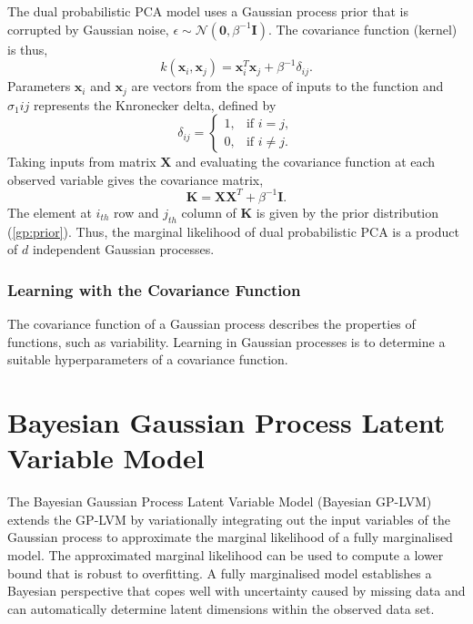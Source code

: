 \documentclass[ %
author={Dillon Keith Diep},
supervisor={Dr. Carl Henrik Ek},
degree={MEng},
title={ART-CG:},
subtitle={Assisted Real-time Content Generation of 3D Hair by Learning Manifolds},
type={Research},
year={2017} ]{dissertation}
\begin{document}
The dual probabilistic PCA model uses a Gaussian process prior that is corrupted by Gaussian noise, \cite{gplvm} $\epsilon\sim\mathcal{N}(\bm{0},\beta^{-1}\bm{I})$.
The covariance function (kernel) is thus,
\begin{equation} \label{gp:prior}
k(\bm{x}_i,\bm{x}_j)=\bm{x}^T_i\bm{x}_j+\beta^{-1}\delta_{ij}.
\end{equation}
Parameters $\bm{x}_i$ and $\bm{x}_j$ are vectors from the space of inputs to the function and $\sigma_1{ij}$ represents the Knronecker delta, defined by 
\begin{equation} \label{kronecker}
\delta_{ij} =
\begin{cases}
1, &         \text{if } i=j,\\
0, &         \text{if } i\neq j.
\end{cases}
\end{equation}
Taking inputs from matrix $\bm{X}$ and evaluating the covariance function at each observed variable gives the covariance matrix,
$$\bm{K=XX}^T+\beta^{-1}\bm{I}.$$
The element at $i_{th}$ row and $j_{th}$ column of $\bm{K}$ is given by the prior distribution (\ref{gp:prior}). Thus, the marginal likelihood of dual probabilistic PCA is a product of $d$ independent Gaussian processes.

\subsubsection{Learning with the Covariance Function}
The covariance function of a Gaussian process describes the properties of functions, such as variability. Learning in Gaussian processes is to determine a suitable hyperparameters of a covariance function.

\section{Bayesian Gaussian Process Latent Variable Model}
The Bayesian Gaussian Process Latent Variable Model (Bayesian GP-LVM) \cite{bgplvm} extends the GP-LVM by variationally integrating out the input variables of the Gaussian process to approximate the marginal likelihood of a fully marginalised model. The approximated marginal likelihood can be used to compute a lower bound that is robust to overfitting. A fully marginalised model establishes a Bayesian perspective that copes well with uncertainty caused by missing data and can automatically determine latent dimensions within the observed data set.
\end{document}
